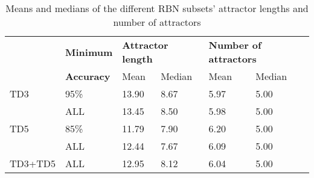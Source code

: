 \begin{table}[h]
    \centering
    \caption{Means and medians of the different RBN subsets' attractor lengths and number of attractors}
    \label{tab:attractor-values}
    \begin{tabular}{llllll}
        \hline
        \hline
        & \textbf{Minimum} & \multicolumn{2}{l}{\textbf{Attractor length}} & \multicolumn{2}{l}{\textbf{Number of attractors}} \\
        & \textbf{Accuracy} & Mean & Median & Mean & Median \\
        \hline
        TD3 & 95\% & 13.90 & 8.67 & 5.97 & 5.00 \\
            & ALL  & 13.45 & 8.50 & 5.98 & 5.00 \\

        TD5 & 85\% & 11.79 & 7.90 & 6.20 & 5.00 \\
            & ALL  & 12.44 & 7.67 & 6.09 & 5.00 \\

        TD3+TD5 & ALL & 12.95 & 8.12 & 6.04 & 5.00 \\
        \hline
    \end{tabular}
\end{table}

